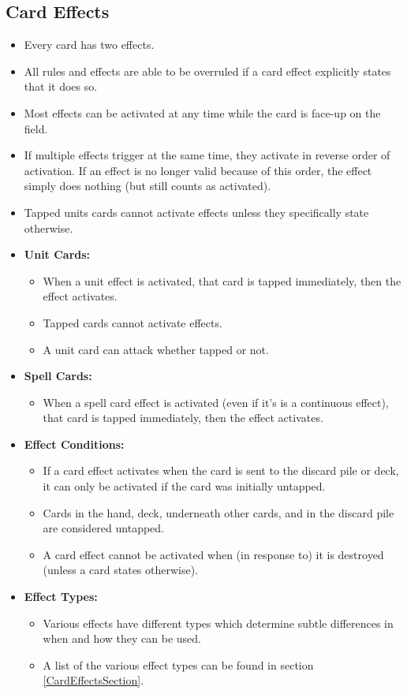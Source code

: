 \subsection{Card Effects\label{CardEffectsRuleSection}}
\begin{itemize}
    \item Every card has two effects.
    \item All rules and effects are able to be overruled if a card effect explicitly states that it does so.
    \item Most effects can be activated at any time while the card is face-up on the field.
    \item If multiple effects trigger at the same time, they activate in reverse order of activation. If an effect is no longer valid because of this order, the effect simply does nothing (but still counts as activated).
    \item Tapped units cards cannot activate effects unless they specifically state otherwise.
    \item \textbf{Unit Cards:}
    \begin{itemize}
        \item When a unit effect is activated, that card is tapped immediately, then the effect activates.
        \item Tapped cards cannot activate effects.
        \item A unit card can attack whether tapped or not.
    \end{itemize}
    \item \textbf{Spell Cards:}
    \begin{itemize}
        \item When a spell card effect is activated (even if it's is a continuous effect), that card is tapped immediately, then the effect activates.
    \end{itemize}
    \item \textbf{Effect Conditions:}
    \begin{itemize}
        \item If a card effect activates when the card is sent to the discard pile or deck, it can only be activated if the card was initially untapped.
        \item Cards in the hand, deck, underneath other cards, and in the discard pile are considered untapped.
        \item A card effect cannot be activated when (in response to) it is destroyed (unless a card states otherwise).
    \end{itemize}
    \item \textbf{Effect Types:} 
    \begin{itemize}
        \item Various effects have different types which determine subtle differences in when and how they can be used.
        \item A list of the various effect types can be found in section \ref{CardEffectsSection}.
    \end{itemize}
\end{itemize}








